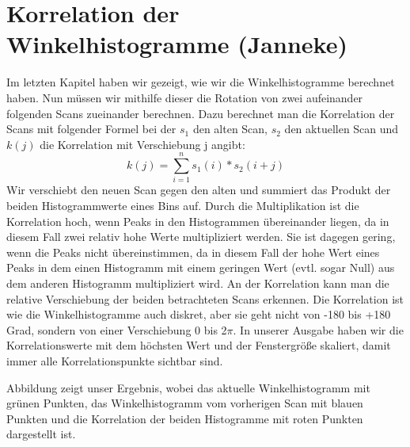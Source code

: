 \section{Korrelation der Winkelhistogramme (Janneke)}

Im letzten Kapitel haben wir gezeigt, wie wir die Winkelhistogramme berechnet haben. Nun müssen wir mithilfe dieser die Rotation von zwei aufeinander folgenden Scans zueinander berechnen. Dazu berechnet man die Korrelation der Scans mit folgender Formel bei der $s_1$ den alten Scan, $s_2$ den aktuellen Scan und $k(j)$ die Korrelation mit Verschiebung j angibt:$$k(j) = \sum_{i = 1}^{n} s_1(i)*s_2(i+j)$$
Wir verschiebt den neuen Scan gegen den alten und summiert das Produkt der beiden Histogrammwerte eines Bins auf. Durch die Multiplikation ist die Korrelation hoch, wenn Peaks in den Histogrammen übereinander liegen, da in diesem Fall zwei relativ hohe Werte multipliziert werden. Sie ist dagegen gering, wenn die Peaks nicht übereinstimmen, da in diesem Fall der hohe Wert eines Peaks in dem einen Histogramm mit einem geringen Wert (evtl. sogar Null) aus dem anderen Histogramm multipliziert wird. An der Korrelation kann man die relative Verschiebung der beiden betrachteten Scans erkennen. Die Korrelation ist wie die Winkelhistogramme auch diskret, aber sie geht nicht von -180 bis +180 Grad, sondern von einer Verschiebung 0 bis 2$\pi$. In unserer Ausgabe haben wir die Korrelationswerte mit dem höchsten Wert und der Fenstergröße skaliert, damit immer alle Korrelationspunkte sichtbar sind.


Abbildung %
zeigt unser Ergebnis, wobei das aktuelle Winkelhistogramm mit grünen Punkten, das Winkelhistogramm vom vorherigen Scan mit blauen Punkten und die Korrelation der beiden Histogramme mit roten Punkten dargestellt ist.